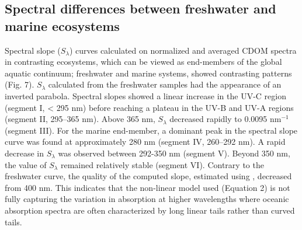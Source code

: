 \subsection*{Spectral differences between freshwater and marine ecosystems}

Spectral slope ($S_\lambda$) curves calculated on normalized and averaged CDOM spectra in contrasting ecosystems, which can be viewed as end-members of the global aquatic continuum; freshwater and marine systems, showed contrasting patterns (Fig. 7). $S_\lambda$ calculated from the freshwater samples had the appearance of an inverted parabola. Spectral slopes showed a linear increase in the UV-C region (segment I, < 295 nm) before reaching a plateau in the UV-B and UV-A regions (segment II, 295--365 nm). Above 365 nm, $S_\lambda$ decreased rapidly to 0.0095 nm$^{-1}$ (segment III). For the marine end-member, a dominant peak in the spectral slope curve was found at approximately 280 nm (segment IV, 260--292 nm). A rapid decrease in $S_\lambda$ was observed between 292-350 nm (segment V). Beyond 350 nm, the value of $S_\lambda$ remained relatively stable (segment VI). Contrary to the freshwater curve, the quality of the computed slope, estimated using \rr, decreased from 400 nm. This indicates that the non-linear model used (Equation 2) is not fully capturing the variation in absorption at higher wavelengths where oceanic absorption spectra are often characterized by long linear tails rather than curved tails.
